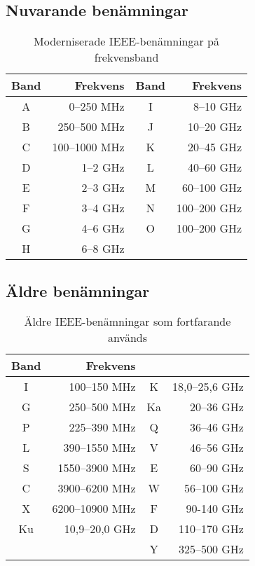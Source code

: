 \subsection{Nuvarande benämningar}

\begin{table}[H]
	\centering
	\begin{tabular}{cr|cr}
		\textbf{Band} & \textbf{Frekvens} & \bf Band & \bf Frekvens \\ \hline
		      A       &        0--250 MHz &    I     &    8--10 GHz \\
		      B       &      250--500 MHz &    J     &   10--20 GHz \\
		      C       &     100--1000 MHz &    K     &   20--45 GHz \\
		      D       &          1--2 GHz &    L     &   40--60 GHz \\
		      E       &          2--3 GHz &    M     &  60--100 GHz \\
		      F       &          3--4 GHz &    N     & 100--200 GHz \\
		      G       &          4--6 GHz &    O     & 100--200 GHz \\
		      H       &          6--8 GHz &          &
	\end{tabular}
	\caption{Moderniserade IEEE-benämningar på frekvensband}
\end{table}

\subsection{Äldre benämningar}

\begin{table}[H]
	\centering
	\begin{tabular}{cr|cr}
		\textbf{Band} & \textbf{Frekvens} &    &                \\ \hline
		      I       &      100--150 MHz & K  & 18,0--25,6 GHz \\
		      G       &      250--500 MHz & Ka &     20--36 GHz \\
		      P       &      225--390 MHz & Q  &     36--46 GHz \\
		      L       &     390--1550 MHz & V  &     46--56 GHz \\
		      S       &    1550--3900 MHz & E  &     60--90 GHz \\
		      C       &    3900--6200 MHz & W  &    56--100 GHz \\
		      X       &   6200--10900 MHz & F  &     90-140 GHz \\
		     Ku       &    10,9--20,0 GHz & D  &   110--170 GHz \\
		              &                   & Y  &   325--500 GHz
	\end{tabular}
	\caption{Äldre IEEE-benämningar som fortfarande används}
\end{table}

